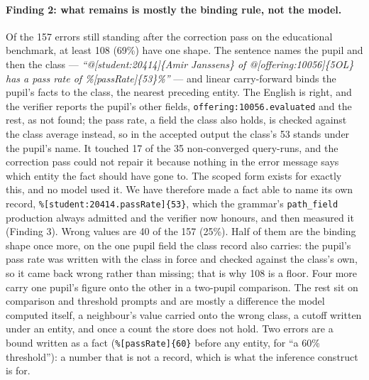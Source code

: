 \documentclass[11pt,a4paper]{article}
\begin{document}
\paragraph{Finding 2: what remains is mostly the binding rule, not the model.} Of the 157 errors still standing after the correction pass on the educational benchmark, at least 108 (69\%) have one shape. The sentence names the pupil and then the class --- \textit{``@[student:20414]\{Amir Janssens\} of @[offering:10056]\{5OL\} has a pass rate of \%[passRate]\{53\}\%''} --- and linear carry-forward binds the pupil's facts to the class, the nearest preceding entity. The English is right, and the verifier reports the pupil's other fields, \texttt{offering:10056.evaluated} and the rest, as not found; the pass rate, a field the class also holds, is checked against the class average instead, so in the accepted output the class's 53 stands under the pupil's name. It touched 17 of the 35 non-converged query-runs, and the correction pass could not repair it because nothing in the error message says which entity the fact should have gone to. The scoped form exists for exactly this, and no model used it. We have therefore made a fact able to name its own record, \texttt{\%[student:20414.passRate]\{53\}}, which the grammar's \texttt{path\_field} production always admitted and the verifier now honours, and then measured it (Finding 3). Wrong values are 40 of the 157 (25\%). Half of them are the binding shape once more, on the one pupil field the class record also carries: the pupil's pass rate was written with the class in force and checked against the class's own, so it came back wrong rather than missing; that is why 108 is a floor. Four more carry one pupil's figure onto the other in a two-pupil comparison. The rest sit on comparison and threshold prompts and are mostly a difference the model computed itself, a neighbour's value carried onto the wrong class, a cutoff written under an entity, and once a count the store does not hold. Two errors are a bound written as a fact (\texttt{\%[passRate]\{60\}} before any entity, for ``a 60\% threshold''): a number that is not a record, which is what the inference construct is for.
\end{document}
